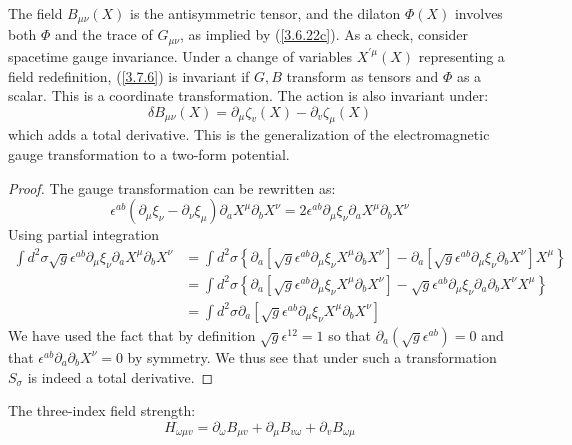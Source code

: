 The field $B_{\mu\nu}(X)$ is the antisymmetric tensor, and the dilaton $\Phi(X)$ involves both $\Phi$ and the trace of $G_{\mu\nu}$, as implied by (\ref{3.6.22c}). As a check, consider spacetime gauge invariance. Under a change of variables $X^{\prime\mu}(X)$ representing a field redefinition, (\ref{3.7.6}) is invariant if $G, B$ transform as tensors and $\Phi$ as a scalar. This is a coordinate transformation. The action is also invariant under:
\begin{equation}
	\delta B_{\mu \nu}(X)=\partial_{\mu} \zeta_{v}(X)-\partial_{v} \zeta_{\mu}(X)\label{3.7.7}
\end{equation}
which adds a total derivative. This is the generalization of the electromagnetic gauge transformation to a two-form potential.
\begin{tcolorbox}[breakable]
	\begin{proof}
		The gauge transformation can be rewritten as:
		$$
		\epsilon^{ab}\left(\partial_\mu \xi_\nu-\partial_\nu \xi_\mu\right) \partial_a X^\mu \partial_b X^\nu=2 \epsilon^{ab} \partial_\mu \xi_\nu \partial_a X^\mu \partial_b X^\nu 
		$$
		Using partial integration
		$$
		\begin{aligned}
			\int d^2 \sigma \sqrt{g} \epsilon^{ab} \partial_\mu \xi_\nu \partial_a X^\mu \partial_b X^\nu & =\int d^2 \sigma\left\{\partial_a\left[\sqrt{g} \epsilon^{ab} \partial_\mu \xi_\nu X^\mu \partial_b X^\nu\right]-\partial_a\left[\sqrt{g} \epsilon^{ab} \partial_\mu \xi_\nu \partial_b X^\nu\right] X^\mu\right\} \\
			& =\int d^2 \sigma\left\{\partial_a\left[\sqrt{g} \epsilon^{ab} \partial_\mu \xi_\nu X^\mu \partial_b X^\nu\right]-\sqrt{g} \epsilon^{ab} \partial_\mu \xi_\nu \partial_a \partial_b X^\nu X^\mu\right\} \\
			& =\int d^2 \sigma \partial_a\left[\sqrt{g} \epsilon^{ab} \partial_\mu \xi_\nu X^\mu \partial_b X^\nu\right] 
		\end{aligned}
		$$
		We have used the fact that by definition $\sqrt{g} \epsilon^{12}=1$ so that $\partial_a\left(\sqrt{g} \epsilon^{ab}\right)=0$ and that $\epsilon^{ab} \partial_a \partial_b X^\nu=0$ by symmetry. We thus see that under such a transformation $S_\sigma$ is indeed a total derivative.
	\end{proof}
\end{tcolorbox}
The three-index field strength:
\begin{equation}
	H_{\omega \mu v}=\partial_{\omega} B_{\mu v}+\partial_{\mu} B_{v \omega}+\partial_{v} B_{\omega \mu}\label{3.7.8}
\end{equation}
